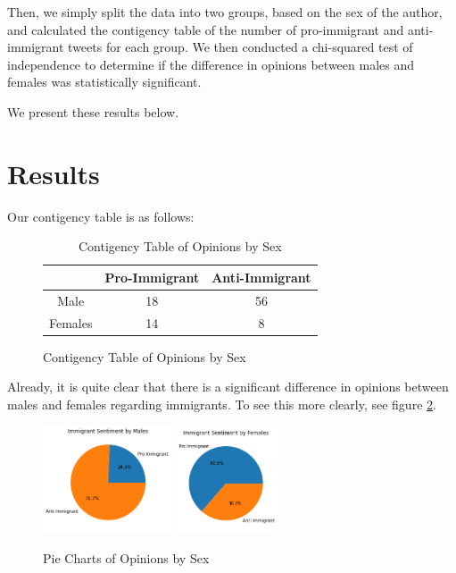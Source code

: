 \documentclass{article}
\begin{document}
Then, we simply split the data into two groups, based on the sex of the author, and calculated the contigency table of the number of pro-immigrant and anti-immigrant tweets for each group. We then conducted a chi-squared test of independence to determine if the difference in opinions between males and females was statistically significant.

We present these results below.

\section{Results}

Our contigency table is as follows:

\begin{figure}[H]
\begin{table}[H]
    \centering
    \begin{tabular}{|c|c|c|}
    \hline
    & Pro-Immigrant & Anti-Immigrant \\ 
    \hline
    Male & 18 & 56 \\ \hline
    Females & 14 & 8 \\
    \hline
    \end{tabular}
    \caption{Contigency Table of Opinions by Sex}
    \label{tab:contigency}
\end{table}
\end{figure}
\vspace{-0.5cm}
Already, it is quite clear that there is a significant difference in opinions between males and females regarding immigrants. To see this more clearly, see figure \ref{fig:piePlots}.

\begin{figure}[H]
    \centering
    \subfloat
    {
        \includegraphics[width=0.34\textwidth]{males.png}
    }
    \subfloat
    {
        \includegraphics[width=0.27\textwidth]{females.png}
    }
    \caption{Pie Charts of Opinions by Sex}
    \label{fig:piePlots}
\end{figure}
\end{document}
